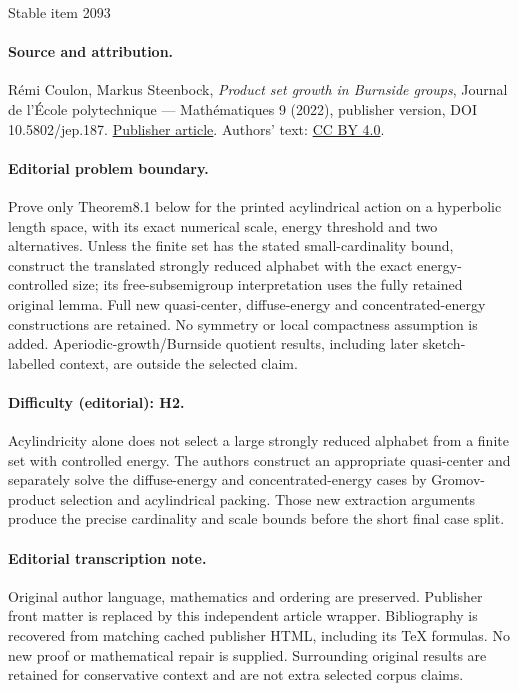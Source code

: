 \documentclass[11pt]{article}
\theoremstyle{plain}
\theoremstyle{definition}
\begin{document}
\begin{center}{\Large Stable item 2093}\end{center}
\paragraph{Source and attribution.}
Rémi Coulon, Markus Steenbock, \emph{Product set growth in Burnside groups}, Journal de l’École polytechnique — Mathématiques 9 (2022), publisher version, DOI 10.5802/jep.187. \href{https://jep.centre-mersenne.org/articles/10.5802/jep.187/}{Publisher article}. Authors' text: \href{https://creativecommons.org/licenses/by/4.0/}{CC BY 4.0}.
\paragraph{Editorial problem boundary.}
Prove only Theorem8.1 below for the printed acylindrical action on a hyperbolic length space, with its exact numerical scale, energy threshold and two alternatives. Unless the finite set has the stated small-cardinality bound, construct the translated strongly reduced alphabet with the exact energy-controlled size; its free-subsemigroup interpretation uses the fully retained original lemma. Full new quasi-center, diffuse-energy and concentrated-energy constructions are retained. No symmetry or local compactness assumption is added. Aperiodic-growth/Burnside quotient results, including later sketch-labelled context, are outside the selected claim.
\paragraph{Difficulty (editorial): H2.}
Acylindricity alone does not select a large strongly reduced alphabet from a finite set with controlled energy. The authors construct an appropriate quasi-center and separately solve the diffuse-energy and concentrated-energy cases by Gromov-product selection and acylindrical packing. Those new extraction arguments produce the precise cardinality and scale bounds before the short final case split.
\paragraph{Editorial transcription note.}
Original author language, mathematics and ordering are preserved. Publisher front matter is replaced by this independent article wrapper. Bibliography is recovered from matching cached publisher HTML, including its TeX formulas. No new proof or mathematical repair is supplied. Surrounding original results are retained for conservative context and are not extra selected corpus claims.
\clearpage
\end{document}
